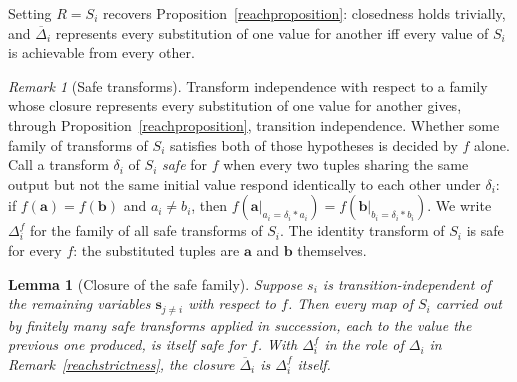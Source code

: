 \documentclass{article}
\newtheorem{lemma}[proposition]{Lemma}
\theoremstyle{definition}
\theoremstyle{remark}
\newtheorem{remark}[proposition]{Remark}
\begin{document}
\noindent Setting $R = S_i$ recovers Proposition~\ref{reachproposition}: closedness holds trivially, and $\overline{\Delta}_i$ represents every substitution of one value for another iff every value of $S_i$ is achievable from every other.

\newpage
\begin{remark}[Safe transforms]
\label{safetransforms}
Transform independence with respect to a family whose closure represents every substitution of one value for another gives, through Proposition~\ref{reachproposition}, transition independence. Whether some family of transforms of $S_i$ satisfies both of those hypotheses is decided by $f$ alone. Call a transform $\delta_i$ of $S_i$ \textit{safe} for $f$ when every two tuples sharing the same output but not the same initial value respond identically to each other under $\delta_i$: if $f(\boldsymbol{a}) = f(\boldsymbol{b})$ and $a_i \neq b_i$, then $f(\boldsymbol{a}|_{a_i = \delta_i \ast a_i}) = f(\boldsymbol{b}|_{b_i = \delta_i \ast b_i})$. We write $\Delta_i^f$ for the family of all safe transforms of $S_i$. The identity transform of $S_i$ is safe for every $f$: the substituted tuples are $\boldsymbol{a}$ and $\boldsymbol{b}$ themselves.
\end{remark}

\begin{lemma}[Closure of the safe family]
\label{safeclosure}
Suppose $s_i$ is transition-independent of the remaining variables $\boldsymbol{s}_{j \neq i}$ with respect to $f$. Then every map of $S_i$ carried out by finitely many safe transforms applied in succession, each to the value the previous one produced, is itself safe for $f$. With $\Delta_i^f$ in the role of $\Delta_i$ in Remark~\ref{reachstrictness}, the closure $\overline{\Delta}_i$ is $\Delta_i^f$ itself.
\end{lemma}
\end{document}
